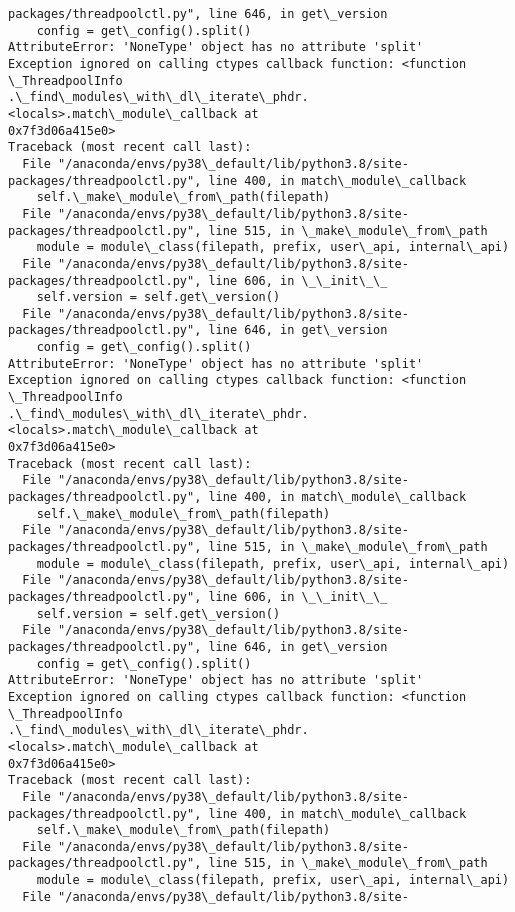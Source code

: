 \documentclass[11pt]{article}
\begin{document}
\begin{Verbatim}[commandchars=\\\{\}]
packages/threadpoolctl.py", line 646, in get\_version
    config = get\_config().split()
AttributeError: 'NoneType' object has no attribute 'split'
Exception ignored on calling ctypes callback function: <function \_ThreadpoolInfo
.\_find\_modules\_with\_dl\_iterate\_phdr.<locals>.match\_module\_callback at
0x7f3d06a415e0>
Traceback (most recent call last):
  File "/anaconda/envs/py38\_default/lib/python3.8/site-
packages/threadpoolctl.py", line 400, in match\_module\_callback
    self.\_make\_module\_from\_path(filepath)
  File "/anaconda/envs/py38\_default/lib/python3.8/site-
packages/threadpoolctl.py", line 515, in \_make\_module\_from\_path
    module = module\_class(filepath, prefix, user\_api, internal\_api)
  File "/anaconda/envs/py38\_default/lib/python3.8/site-
packages/threadpoolctl.py", line 606, in \_\_init\_\_
    self.version = self.get\_version()
  File "/anaconda/envs/py38\_default/lib/python3.8/site-
packages/threadpoolctl.py", line 646, in get\_version
    config = get\_config().split()
AttributeError: 'NoneType' object has no attribute 'split'
Exception ignored on calling ctypes callback function: <function \_ThreadpoolInfo
.\_find\_modules\_with\_dl\_iterate\_phdr.<locals>.match\_module\_callback at
0x7f3d06a415e0>
Traceback (most recent call last):
  File "/anaconda/envs/py38\_default/lib/python3.8/site-
packages/threadpoolctl.py", line 400, in match\_module\_callback
    self.\_make\_module\_from\_path(filepath)
  File "/anaconda/envs/py38\_default/lib/python3.8/site-
packages/threadpoolctl.py", line 515, in \_make\_module\_from\_path
    module = module\_class(filepath, prefix, user\_api, internal\_api)
  File "/anaconda/envs/py38\_default/lib/python3.8/site-
packages/threadpoolctl.py", line 606, in \_\_init\_\_
    self.version = self.get\_version()
  File "/anaconda/envs/py38\_default/lib/python3.8/site-
packages/threadpoolctl.py", line 646, in get\_version
    config = get\_config().split()
AttributeError: 'NoneType' object has no attribute 'split'
Exception ignored on calling ctypes callback function: <function \_ThreadpoolInfo
.\_find\_modules\_with\_dl\_iterate\_phdr.<locals>.match\_module\_callback at
0x7f3d06a415e0>
Traceback (most recent call last):
  File "/anaconda/envs/py38\_default/lib/python3.8/site-
packages/threadpoolctl.py", line 400, in match\_module\_callback
    self.\_make\_module\_from\_path(filepath)
  File "/anaconda/envs/py38\_default/lib/python3.8/site-
packages/threadpoolctl.py", line 515, in \_make\_module\_from\_path
    module = module\_class(filepath, prefix, user\_api, internal\_api)
  File "/anaconda/envs/py38\_default/lib/python3.8/site-

\end{Verbatim}
\end{document}
